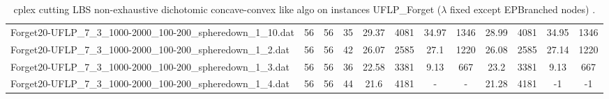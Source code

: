 \begin{sidewaystable}[!ht]
{\begin{tabular}{lccccccccccc}
Forget20-UFLP\_7\_3\_1000-2000\_100-200\_spheredown\_1\_10.dat & 56 & 56 & 35 & 29.37 & 4081 & 34.97 & 1346 &  \textcolor{blue2}{28.99} & 4081 & 34.95 & 1346 \\
Forget20-UFLP\_7\_3\_1000-2000\_100-200\_spheredown\_1\_2.dat & 56 & 56 & 42 & 26.07 & 2585 & 27.1 & 1220 & 26.08 & 2585 & 27.14 & 1220 \\
Forget20-UFLP\_7\_3\_1000-2000\_100-200\_spheredown\_1\_3.dat & 56 & 56 & 36 & 22.58 & 3381 &  \textcolor{blue2}{9.13} & 667 & 23.2 & 3381 &  \textcolor{blue2}{9.13} & 667 \\
Forget20-UFLP\_7\_3\_1000-2000\_100-200\_spheredown\_1\_4.dat & 56 & 56 & 44 & 21.6 & 4181 &  - &  - & 21.28 & 4181 & -1 & -1 \\
\bottomrule
\end{tabular}
}%
\caption{cplex cutting LBS non-exhaustive dichotomic concave-convex like algo on instances UFLP_Forget ($\lambda$ fixed except EPBranched nodes) .}
\end{sidewaystable}
